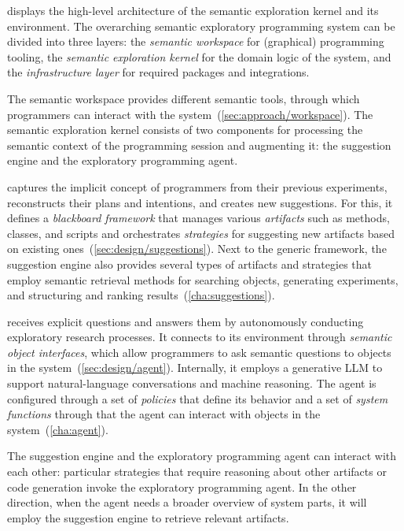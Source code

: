  displays the high-level architecture of the semantic exploration kernel and its environment.
The overarching semantic exploratory programming system can be divided into three layers: the \emph{semantic workspace} for (graphical) programming tooling, the \emph{semantic exploration kernel} for the domain logic of the system, and the \emph{infrastructure layer} for required packages and integrations.

The semantic workspace provides different semantic tools, through which programmers can interact with the system~(\cref{sec:approach/workspace}).
The semantic exploration kernel consists of two components for processing the semantic context of the programming session and augmenting it: the suggestion engine and the exploratory programming agent.

\begin{description}[noextralabelsep]
	\item[The suggestion engine] captures the implicit concept of programmers from their previous experiments, reconstructs their plans and intentions, and creates new suggestions.
	For this, it defines a \emph{blackboard framework} that manages various \emph{artifacts} such as methods, classes, and scripts and orchestrates \emph{strategies} for suggesting new artifacts based on existing ones~(\cref{sec:design/suggestions}).
	Next to the generic framework, the suggestion engine also provides several types of artifacts and strategies that employ semantic retrieval methods for searching objects, generating experiments, and structuring and ranking results~(\cref{cha:suggestions}).
	\item[The exploratory programming agent] receives explicit questions and answers them by autonomously conducting exploratory research processes.
	It connects to its environment through \emph{semantic object interfaces}, which allow programmers to ask semantic questions to objects in the system~(\cref{sec:design/agent}).
	Internally, it employs a generative LLM to support natural-language conversations and machine reasoning. %
	The agent is configured through a set of \emph{policies} that define its behavior and a set of \emph{system functions} through that the agent can interact with objects in the system~(\cref{cha:agent}).
\end{description}

The suggestion engine and the exploratory programming agent can interact with each other:
particular strategies that require reasoning about other artifacts or code generation invoke the exploratory programming agent.
In the other direction, when the agent needs a broader overview of system parts, it will employ the suggestion engine to retrieve relevant artifacts.

